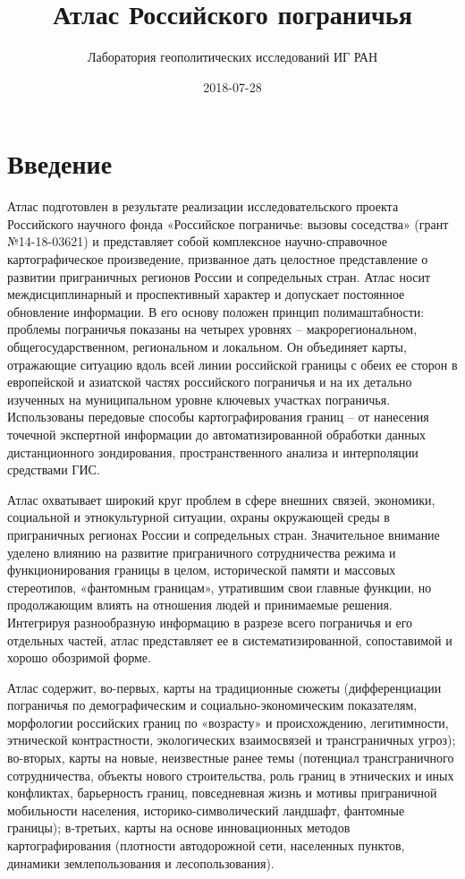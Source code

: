 \documentclass[]{book}
\title{Атлас Российского пограничья}
\author{Лаборатория геополитических исследований ИГ РАН}
\date{2018-07-28}
\begin{document}
\maketitle

{
\setcounter{tocdepth}{1}
\tableofcontents
}
\chapter*{Введение}

Атлас подготовлен в результате реализации исследовательского проекта
Российского научного фонда «Российское пограничье: вызовы соседства»
(грант №14-18-03621) и представляет собой комплексное научно-справочное
картографическое произведение, призванное дать целостное представление о
развитии приграничных регионов России и сопредельных стран. Атлас носит
междисциплинарный и проспективный характер и допускает постоянное
обновление информации. В его основу положен принцип полимаштабности:
проблемы пограничья показаны на четырех уровнях -- макрорегиональном,
общегосударственном, региональном и локальном. Он объединяет карты,
отражающие ситуацию вдоль всей линии российской границы с обеих ее
сторон в европейской и азиатской частях российского пограничья и на их
детально изученных на муниципальном уровне ключевых участках пограничья.
Использованы передовые способы картографирования границ -- от нанесения
точечной экспертной информации до автоматизированной обработки данных
дистанционного зондирования, пространственного анализа и интерполяции
средствами ГИС.

Атлас охватывает широкий круг проблем в сфере внешних связей, экономики,
социальной и этнокультурной ситуации, охраны окружающей среды в
приграничных регионах России и сопредельных стран. Значительное внимание
уделено влиянию на развитие приграничного сотрудничества режима и
функционирования границы в целом, исторической памяти и массовых
стереотипов, «фантомным границам», утратившим свои главные функции, но
продолжающим влиять на отношения людей и принимаемые решения. Интегрируя
разнообразную информацию в разрезе всего пограничья и его отдельных
частей, атлас представляет ее в систематизированной, сопоставимой и
хорошо обозримой форме.

Атлас содержит, во-первых, карты на традиционные сюжеты (дифференциации
пограничья по демографическим и социально-экономическим показателям,
морфологии российских границ по «возрасту» и происхождению,
легитимности, этнической контрастности, экологических взаимосвязей и
трансграничных угроз); во-вторых, карты на новые, неизвестные ранее темы
(потенциал трансграничного сотрудничества, объекты нового строительства,
роль границ в этнических и иных конфликтах, барьерность границ,
повседневная жизнь и мотивы приграничной мобильности населения,
историко-символический ландшафт, фантомные границы); в-третьих, карты на
основе инновационных методов картографирования (плотности автодорожной
сети, населенных пунктов, динамики землепользования и лесопользования).
\end{document}
